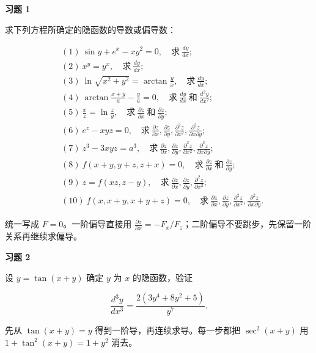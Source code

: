 \begin{exercisebox}
\textbf{习题 1}

求下列方程所确定的隐函数的导数或偏导数：

\[
      \begin{aligned}
      &(1)\ \sin y+e^x-xy^2=0,\quad \text{求}\ \frac{dy}{dx};\\
      &(2)\ x^y=y^x,\quad \text{求}\ \frac{dy}{dx};\\
      &(3)\ \ln\sqrt{x^2+y^2}=\arctan\frac{y}{x},\quad \text{求}\ \frac{dy}{dx};\\
      &(4)\ \arctan\frac{x+y}{a}-\frac{y}{a}=0,\quad \text{求}\ \frac{dy}{dx}\ \text{和}\ \frac{d^2y}{dx^2};\\
      &(5)\ \frac{x}{z}=\ln\frac{z}{y},\quad \text{求}\ \frac{\partial z}{\partial x}\ \text{和}\ \frac{\partial z}{\partial y};\\
      &(6)\ e^z-xyz=0,\quad \text{求}\ \frac{\partial z}{\partial x},\frac{\partial z}{\partial y},
      \frac{\partial^2 z}{\partial x^2},\frac{\partial^2 z}{\partial x\partial y};\\
      &(7)\ z^3-3xyz=a^3,\quad \text{求}\ \frac{\partial z}{\partial x},\frac{\partial z}{\partial y},
      \frac{\partial^2 z}{\partial x^2},\frac{\partial^2 z}{\partial x\partial y};\\
      &(8)\ f(x+y,y+z,z+x)=0,\quad \text{求}\ \frac{\partial z}{\partial x}\ \text{和}\ \frac{\partial z}{\partial y};\\
      &(9)\ z=f(xz,z-y),\quad \text{求}\ \frac{\partial z}{\partial x},\frac{\partial z}{\partial y},\frac{\partial^2 z}{\partial x^2};\\
      &(10)\ f(x,x+y,x+y+z)=0,\quad \text{求}\ \frac{\partial z}{\partial x},\frac{\partial z}{\partial y},
      \frac{\partial^2 z}{\partial x^2},\frac{\partial^2 z}{\partial x\partial y}.
      \end{aligned}
      \]

\begin{hintbox}
统一写成 \(F=0\)。一阶偏导直接用 \(\frac{\partial z}{\partial x}=-F_x/F_z\)；二阶偏导不要跳步，先保留一阶关系再继续求偏导。
\end{hintbox}
\end{exercisebox}

\begin{exercisebox}
\textbf{习题 2}

设 \(y=\tan(x+y)\) 确定 \(y\) 为 \(x\) 的隐函数，验证

\[
        \frac{d^3y}{dx^3}
        =
        \frac{2(3y^4+8y^2+5)}{y^7}.
      \]

\begin{hintbox}
先从 \(\tan(x+y)=y\) 得到一阶导，再连续求导。每一步都把 \(\sec^2(x+y)\) 用 \(1+\tan^2(x+y)=1+y^2\) 消去。
\end{hintbox}
\end{exercisebox}

